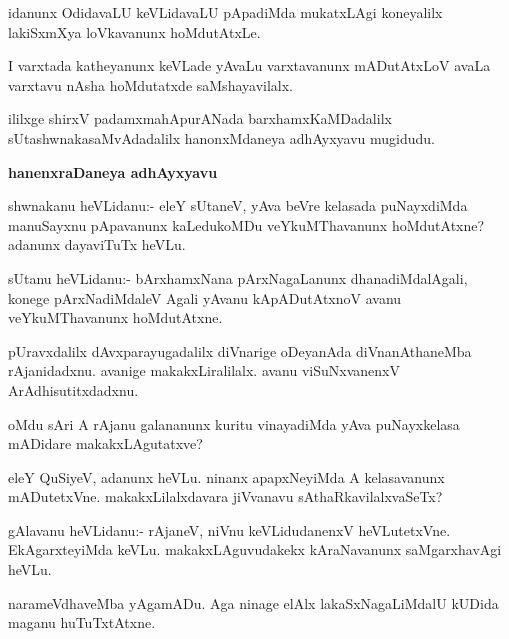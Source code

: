 \begin{mng}
idanunx OdidavaLU keVLidavaLU pApadiMda mukatxLAgi koneyalilx lakiSxmXya loVkavanunx hoMdutAtxLe.
\end{mng}

\begin{mng}
I varxtada katheyanunx keVLade yAvaLu varxtavanunx mADutAtxLoV avaLa varxtavu nAsha hoMdutatxde saMshayavilalx.
\end{mng}
ililxge shirxV padamxmahApurANada barxhamxKaMDadalilx sUtashwnakasaMvAdadalilx hanonxMdaneya adhAyxyavu mugidudu.

\begin{center}
\textbf{\large hanenxraDaneya adhAyxyavu}
\end{center}

\begin{mng}
shwnakanu heVLidanu:- eleY sUtaneV, yAva beVre kelasada puNayxdiMda manuSayxnu pApavanunx kaLedukoMDu veYkuMThavanunx hoMdutAtxne? adanunx dayaviTuTx heVLu.
\end{mng}

\begin{mng}
sUtanu heVLidanu:- bArxhamxNana pArxNagaLanunx dhanadiMdalAgali, konege pArxNadiMdaleV Agali yAvanu kApADutAtxnoV avanu veYkuMThavanunx hoMdutAtxne.
\end{mng}

\begin{mng}
pUravxdalilx dAvxparayugadalilx diVnarige oDeyanAda diVnanAthaneMba rAjanidadxnu. avanige makakxLiralilalx. avanu viSuNxvanenxV ArAdhisutitxdadxnu.
\end{mng}

\begin{mng}
oMdu sAri A rAjanu galananunx kuritu vinayadiMda yAva puNayxkelasa mADidare makakxLAgutatxve?
\end{mng}

\begin{mng}
eleY QuSiyeV, adanunx heVLu. ninanx apapxNeyiMda A kelasavanunx mADutetxVne. makakxLilalxdavara jiVvanavu sAthaRkavilalxvaSeTx?
\end{mng}

\begin{mng}
gAlavanu heVLidanu:- rAjaneV, niVnu keVLidudanenxV heVLutetxVne. EkAgarxteyiMda keVLu. makakxLAguvudakekx kAraNavanunx saMgarxhavAgi heVLu.
\end{mng}

\begin{mng}
narameVdhaveMba yAgamADu. Aga ninage elAlx lakaSxNagaLiMdalU kUDida maganu huTuTxtAtxne.
\end{mng}

